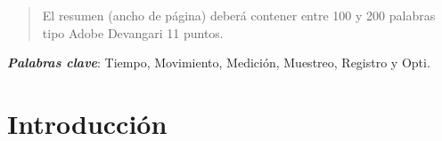     
    
    
    \maketitle
    \thispagestyle{fancy}
    
    
    
    \begin{abstract}
    \noindent 
    El resumen (ancho de página) deberá contener entre 100 y 200 palabras tipo Adobe Devangari 11 puntos.
    
    \end{abstract}
    \textbf{\textit{Palabras clave}}: {Tiempo, Movimiento, Medición, Muestreo, Registro y Opti.}
    
    \section{Introducción}
    
